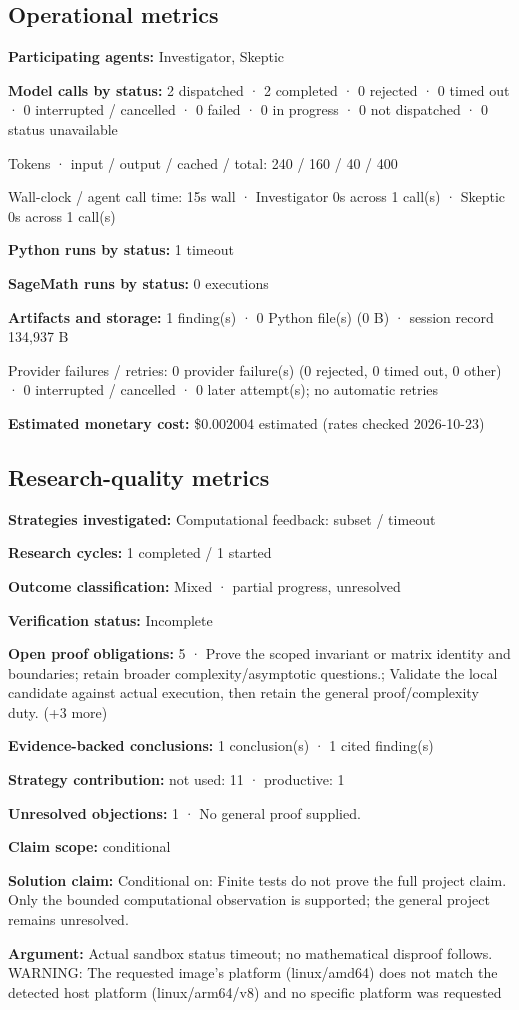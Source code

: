 \documentclass[11pt]{article}
\begin{document}
\subsection{Operational metrics}
\textbf{Participating agents:} Investigator, Skeptic\par
\textbf{Model calls by status:} 2 dispatched · 2 completed · 0 rejected · 0 timed out · 0 interrupted / cancelled · 0 failed · 0 in progress · 0 not dispatched · 0 status unavailable\par
Tokens · input / output / cached / total: 240 / 160 / 40 / 400\par
Wall-clock / agent call time: 15s wall · Investigator 0s across 1 call(s) · Skeptic 0s across 1 call(s)\par
\textbf{Python runs by status:} 1 timeout\par
\textbf{SageMath runs by status:} 0 executions\par
\textbf{Artifacts and storage:} 1 finding(s) · 0 Python file(s) (0 B) · session record 134,937 B\par
Provider failures / retries: 0 provider failure(s) (0 rejected, 0 timed out, 0 other) · 0 interrupted / cancelled · 0 later attempt(s); no automatic retries\par
\textbf{Estimated monetary cost:} \$0.002004 estimated (rates checked 2026-10-23)\par
\subsection{Research-quality metrics}
\textbf{Strategies investigated:} Computational feedback: subset / timeout\par
\textbf{Research cycles:} 1 completed / 1 started\par
\textbf{Outcome classification:} Mixed · partial progress, unresolved\par
\textbf{Verification status:} Incomplete\par
\textbf{Open proof obligations:} 5 · Prove the scoped invariant or matrix identity and boundaries; retain broader complexity/asymptotic questions.; Validate the local candidate against actual execution, then retain the general proof/complexity duty. (+3 more)\par
\textbf{Evidence-backed conclusions:} 1 conclusion(s) · 1 cited finding(s)\par
\textbf{Strategy contribution:} not used: 11 · productive: 1\par
\textbf{Unresolved objections:} 1 · No general proof supplied.\par
\textbf{Claim scope:} conditional\par
\textbf{Solution claim:} Conditional on: Finite tests do not prove the full project claim. Only the bounded computational observation is supported; the general project remains unresolved.\par
\textbf{Argument:} Actual sandbox status timeout; no mathematical disproof follows. WARNING: The requested image's platform (linux/amd64) does not match the detected host platform (linux/arm64/v8) and no specific platform was requested
\end{document}
